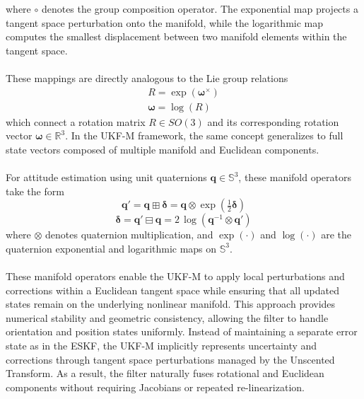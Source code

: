 where $\circ$ denotes the group composition operator. The exponential map projects a tangent space perturbation onto the manifold, while the logarithmic map computes the smallest displacement between two manifold elements within the tangent space.  
\\ \\
These mappings are directly analogous to the Lie group relations
$$
\begin{aligned}
    R = \exp(\boldsymbol{\omega}^\times) \\
    \boldsymbol{\omega} = \log(R)
\end{aligned}
$$
which connect a rotation matrix $R \in SO(3)$ and its corresponding rotation vector $\boldsymbol{\omega} \in \mathbb{R}^3$. In the UKF-M framework, the same concept generalizes to full state vectors composed of multiple manifold and Euclidean components.  
\\ \\
For attitude estimation using unit quaternions $\mathbf{q} \in \mathbb{S}^3$, these manifold operators take the form
$$
    \mathbf{q}' = \mathbf{q} \boxplus \boldsymbol{\delta} = \mathbf{q} \otimes \exp\!\left(\tfrac{1}{2}\boldsymbol{\delta}\right)
$$
$$
    \boldsymbol{\delta} = \mathbf{q}' \boxminus \mathbf{q} = 2\,\log\!\left(\mathbf{q}^{-1} \otimes \mathbf{q}'\right)
$$
where $\otimes$ denotes quaternion multiplication, and $\exp(\cdot)$ and $\log(\cdot)$ are the quaternion exponential and logarithmic maps on $\mathbb{S}^3$. 
\\ \\
These manifold operators enable the UKF-M to apply local perturbations and corrections within a Euclidean tangent space while ensuring that all updated states remain on the underlying nonlinear manifold. This approach provides numerical stability and geometric consistency, allowing the filter to handle orientation and position states uniformly. Instead of maintaining a separate error state as in the ESKF, the UKF-M implicitly represents uncertainty and corrections through tangent space perturbations managed by the Unscented Transform. As a result, the filter naturally fuses rotational and Euclidean components without requiring Jacobians or repeated re-linearization.














